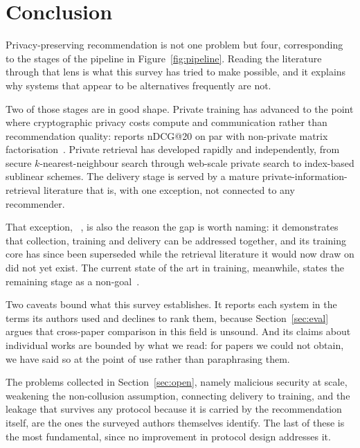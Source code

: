 \section{Conclusion}
\label{sec:conclusion}

Privacy-preserving recommendation is not one problem but four, corresponding to the stages of the
pipeline in Figure~\ref{fig:pipeline}. Reading the literature through that lens is what this
survey has tried to make possible, and it explains why systems that appear to be alternatives
frequently are not.

Two of those stages are in good shape. Private training has advanced to the point where
cryptographic privacy costs compute and communication rather than recommendation quality:
\nudgeplain{} reports nDCG@20 on par with non-private matrix factorisation~\cite{nudge2026}.
Private retrieval has developed rapidly and independently, from secure $k$-nearest-neighbour
search through web-scale private search to index-based sublinear schemes. The delivery stage is
served by a mature private-information-retrieval literature that is, with one exception, not
connected to any recommender.

That exception, \pirsonaplain{}~\cite{pirsona2021}, is also the reason the gap is worth naming:
it demonstrates that collection, training and delivery can be addressed together, and its
training core has since been superseded while the retrieval literature it would now draw on did
not yet exist. The current state of the art in training, meanwhile, states the remaining stage as
a non-goal~\cite{nudge2026}.

Two caveats bound what this survey establishes. It reports each system in the terms its authors
used and declines to rank them, because Section~\ref{sec:eval} argues that cross-paper comparison
in this field is unsound. And its claims about individual works are bounded by what we read: for
papers we could not obtain, we have said so at the point of use rather than paraphrasing them.

The problems collected in Section~\ref{sec:open}, namely malicious security at scale, weakening the
non-collusion assumption, connecting delivery to training, and the leakage that survives any
protocol because it is carried by the recommendation itself, are the ones the surveyed authors
themselves identify. The last of these is the most fundamental, since no improvement in protocol
design addresses it.
